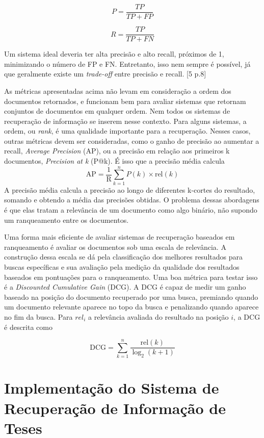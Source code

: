 \documentclass[
	12pt,				%
	openright,			%
	oneside,			%
	a4paper,			%
	english,			%
	french,				%
	spanish,			%
	brazil				%
	]{abntex2}
\begin{document}
$$P = \frac{TP}{TP + FP}$$

$$R = \frac{TP}{TP + FN}$$

Um sistema ideal deveria ter alta precisão e alto recall, próximos de 1, minimizando o número de FP e FN.
Entretanto, isso nem sempre é possível, já que geralmente existe um \textit{trade-off} entre precisão e recall. [5 p.8]

As métricas apresentadas acima não levam em consideração a ordem dos documentos retornados, e funcionam bem para avaliar sistemas que retornam conjuntos de documentos em qualquer ordem.
Nem todos os sistemas de recuperação de informação se inserem nesse contexto.
Para alguns sistemas, a ordem, ou \textit{rank}, é uma qualidade importante para a recuperação.
Nesses casos, outras métricas devem ser consideradas, como o ganho de precisão ao aumentar a recall, \textit{Average Precision} (AP), ou a precisão em relação aos primeiros k documentos, \textit{Precision at k} (P@k).
É isso que a precisão média calcula
$$\text{AP} = \frac{1}{\text{R}} \sum_{k=1}^n P(k) \times \text{rel}(k)$$
A precisão média calcula a precisão ao longo de diferentes k-cortes do resultado, somando e obtendo a média das precisões obtidas.
O problema dessas abordagens é que elas tratam a relevância de um documento como algo binário, não supondo um ranqueamento entre os documentos.

Uma forma mais eficiente de avaliar sistemas de recuperação baseados em ranqueamento é avaliar os documentos sob uma escala de relevância.
A construção dessa escala se dá pela classificação dos melhores resultados para buscas específicas e sua avaliação pela medição da qualidade dos resultados baseados em pontuações para o ranqueamento.
Uma boa métrica para testar isso é a \textit{Discounted Cumulative Gain} (DCG).
A DCG é capaz de medir um ganho baseado na posição do documento recuperado por uma busca, premiando quando um documento relevante aparece no topo da busca e penalizando quando aparece no fim da busca. Para $rel_i$ a relevância avaliada do resultado na posição $i$, a DCG é descrita como

$$\text{DCG} = \sum_{k=1}^n \frac{\text{rel}(k)}{\log_2(k + 1)}$$


\chapter{Implementação do Sistema de Recuperação de Informação de Teses}
\label{ch:implementacao-do-sistema-de-recuperacao-de-informacao-de-teses}
\end{document}
